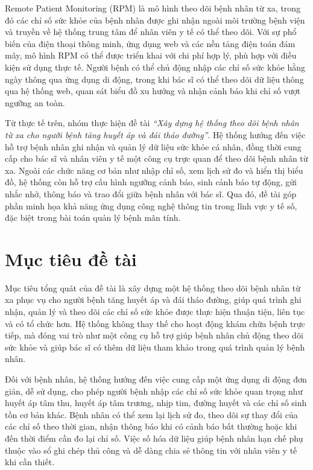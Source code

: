 Remote Patient Monitoring (RPM) là mô hình theo dõi bệnh nhân từ xa, trong đó các chỉ số sức khỏe của bệnh nhân được ghi nhận ngoài môi trường bệnh viện và truyền về hệ thống trung tâm để nhân viên y tế có thể theo dõi. Với sự phổ biến của điện thoại thông minh, ứng dụng web và các nền tảng điện toán đám mây, mô hình RPM có thể được triển khai với chi phí hợp lý, phù hợp với điều kiện sử dụng thực tế. Người bệnh có thể chủ động nhập các chỉ số sức khỏe hằng ngày thông qua ứng dụng di động, trong khi bác sĩ có thể theo dõi dữ liệu thông qua hệ thống web, quan sát biểu đồ xu hướng và nhận cảnh báo khi chỉ số vượt ngưỡng an toàn.

Từ thực tế trên, nhóm thực hiện đề tài \textit{``Xây dựng hệ thống theo dõi bệnh nhân từ xa cho người bệnh tăng huyết áp và đái tháo đường''}. Hệ thống hướng đến việc hỗ trợ bệnh nhân ghi nhận và quản lý dữ liệu sức khỏe cá nhân, đồng thời cung cấp cho bác sĩ và nhân viên y tế một công cụ trực quan để theo dõi bệnh nhân từ xa. Ngoài các chức năng cơ bản như nhập chỉ số, xem lịch sử đo và hiển thị biểu đồ, hệ thống còn hỗ trợ cấu hình ngưỡng cảnh báo, sinh cảnh báo tự động, gửi nhắc nhở, thông báo và trao đổi giữa bệnh nhân với bác sĩ. Qua đó, đề tài góp phần minh họa khả năng ứng dụng công nghệ thông tin trong lĩnh vực y tế số, đặc biệt trong bài toán quản lý bệnh mãn tính.

\section{Mục tiêu đề tài}
Mục tiêu tổng quát của đề tài là xây dựng một hệ thống theo dõi bệnh nhân từ xa phục vụ cho người bệnh tăng huyết áp và đái tháo đường, giúp quá trình ghi nhận, quản lý và theo dõi các chỉ số sức khỏe được thực hiện thuận tiện, liên tục và có tổ chức hơn. Hệ thống không thay thế cho hoạt động khám chữa bệnh trực tiếp, mà đóng vai trò như một công cụ hỗ trợ giúp bệnh nhân chủ động theo dõi sức khỏe và giúp bác sĩ có thêm dữ liệu tham khảo trong quá trình quản lý bệnh nhân.

Đối với bệnh nhân, hệ thống hướng đến việc cung cấp một ứng dụng di động đơn giản, dễ sử dụng, cho phép người bệnh nhập các chỉ số sức khỏe quan trọng như huyết áp tâm thu, huyết áp tâm trương, nhịp tim, đường huyết và các chỉ số sinh tồn cơ bản khác. Bệnh nhân có thể xem lại lịch sử đo, theo dõi sự thay đổi của các chỉ số theo thời gian, nhận thông báo khi có cảnh báo bất thường hoặc khi đến thời điểm cần đo lại chỉ số. Việc số hóa dữ liệu giúp bệnh nhân hạn chế phụ thuộc vào sổ ghi chép thủ công và dễ dàng chia sẻ thông tin với nhân viên y tế khi cần thiết.

